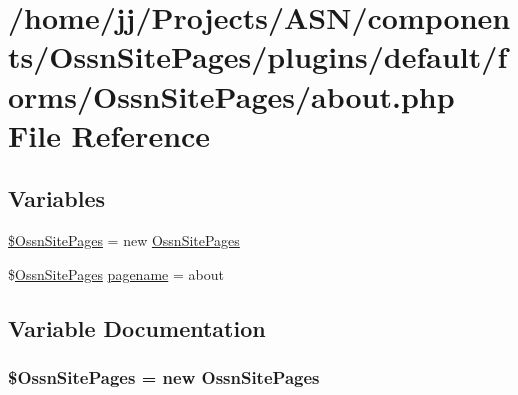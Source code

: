 \hypertarget{_ossn_site_pages_2plugins_2default_2forms_2_ossn_site_pages_2about_8php}{}\section{/home/jj/\+Projects/\+A\+S\+N/components/\+Ossn\+Site\+Pages/plugins/default/forms/\+Ossn\+Site\+Pages/about.php File Reference}
\label{_ossn_site_pages_2plugins_2default_2forms_2_ossn_site_pages_2about_8php}
\subsection*{Variables}
\begin{DoxyCompactItemize}
\item 
\hyperlink{_ossn_site_pages_2plugins_2default_2forms_2_ossn_site_pages_2about_8php_ae6d62adf54fdace37cf84f4a754bcc3b}{\$\+Ossn\+Site\+Pages} = new \hyperlink{class_ossn_site_pages}{Ossn\+Site\+Pages}
\item 
\$\hyperlink{class_ossn_site_pages}{Ossn\+Site\+Pages} \hyperlink{_ossn_site_pages_2plugins_2default_2forms_2_ossn_site_pages_2about_8php_a790771bf91bb6454bf0c60185eb09c9f}{pagename} = \textquotesingle{}about\textquotesingle{}
\end{DoxyCompactItemize}


\subsection{Variable Documentation}
\subsubsection[{\texorpdfstring{\$\+Ossn\+Site\+Pages}{$OssnSitePages}}]{\setlength{\rightskip}{0pt plus 5cm}\${\bf Ossn\+Site\+Pages} = new {\bf Ossn\+Site\+Pages}}\hypertarget{_ossn_site_pages_2plugins_2default_2forms_2_ossn_site_pages_2about_8php_ae6d62adf54fdace37cf84f4a754bcc3b}{}\label{_ossn_site_pages_2plugins_2default_2forms_2_ossn_site_pages_2about_8php_ae6d62adf54fdace37cf84f4a754bcc3b}


